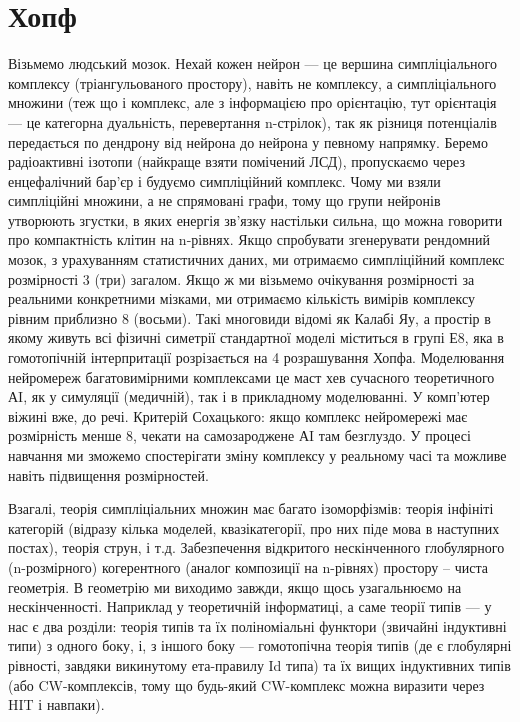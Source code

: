 \section{Хопф}

Візьмемо людський мозок. Нехай кожен нейрон --- це вершина симпліціального
комплексу (тріангульованого простору), навіть не комплексу, а симпліціального
множини (теж що і комплекс, але з інформацією про орієнтацію, тут орієнтація ---
це категорна дуальність, перевертання n-стрілок), так як різниця потенціалів
передається по дендрону від нейрона до нейрона у певному напрямку. Беремо
радіоактивні ізотопи (найкраще взяти помічений ЛСД), пропускаємо через
енцефалічний бар'єр і будуємо симпліційний комплекс. Чому ми взяли симпліційні
множини, а не спрямовані графи, тому що групи нейронів утворюють згустки,
в яких енергія зв'язку настільки сильна, що можна говорити про компактність
клітин на n-рівнях. Якщо спробувати згенерувати рендомний мозок, з урахуванням
статистичних даних, ми отримаємо симпліційний комплекс розмірності 3 (три) загалом.
Якщо ж ми візьмемо очікування розмірності за реальними конкретними мізками,
ми отримаємо кількість вимірів комплексу рівним приблизно 8 (восьми). Такі
многовиди відомі як Калабі Яу, а простір в якому живуть всі фізичні симетрії
стандартної моделі міститься в групі Е8, яка в гомотопічній інтерпритації
розрізається на 4 розрашування Хопфа. Моделювання нейромереж багатовимірними
комплексами це маст хев сучасного теоретичного АI, як у симуляції (медичній),
так і в прикладному моделюванні. У комп'ютер віжині вже, до речі. Критерій
Сохацького: якщо комплекс нейромережі має розмірність менше 8, чекати на
самозароджене АI там безглуздо. У процесі навчання ми зможемо спостерігати
зміну комплексу у реальному часі та можливе навіть підвищення розмірностей.

Взагалі, теорія симпліціальних множин має багато ізоморфізмів: теорія інфініті
категорій (відразу кілька моделей, квазікатегорії, про них піде мова в наступних
постах), теорія струн, і т.д. Забезпечення відкритого нескінченного
глобулярного (n-розмірного) когерентного (аналог композиції на n-рівнях)
простору – чиста геометрія. В геометрію ми виходимо завжди, якщо щось узагальнюємо
на нескінченності. Наприклад у теоретичній інформатиці, а саме теорії типів ---
у нас є два розділи: теорія типів та їх поліноміальні функтори (звичайні індуктивні
типи) з одного боку, і, з іншого боку — гомотопічна теорія типів (де є глобулярні
рівності, завдяки викинутому ета-правилу Id типа) та їх вищих індуктивних
типів (або CW-комплексів, тому що будь-який CW-комплекс можна виразити через HIT і навпаки).
